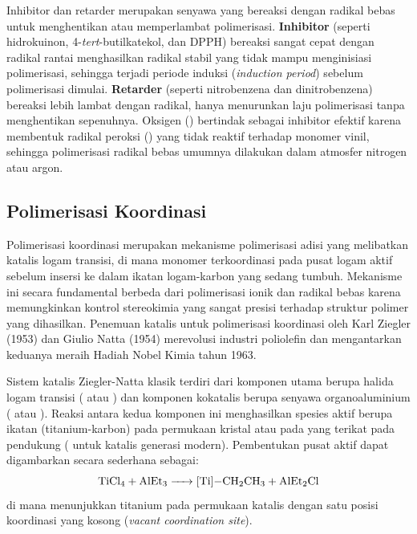 \documentclass[12pt,a4paper,openany]{book}
\begin{document}
Inhibitor dan retarder merupakan senyawa yang bereaksi dengan radikal bebas untuk menghentikan atau memperlambat polimerisasi. \textbf{Inhibitor} (seperti hidrokuinon, 4-\textit{tert}-butilkatekol, dan DPPH) bereaksi sangat cepat dengan radikal rantai menghasilkan radikal stabil yang tidak mampu menginisiasi polimerisasi, sehingga terjadi periode induksi (\textit{induction period}) sebelum polimerisasi dimulai. \textbf{Retarder} (seperti nitrobenzena dan dinitrobenzena) bereaksi lebih lambat dengan radikal, hanya menurunkan laju polimerisasi tanpa menghentikan sepenuhnya. Oksigen () bertindak sebagai inhibitor efektif karena membentuk radikal peroksi () yang tidak reaktif terhadap monomer vinil, sehingga polimerisasi radikal bebas umumnya dilakukan dalam atmosfer nitrogen atau argon.

\subsection{Polimerisasi Koordinasi}

Polimerisasi koordinasi merupakan mekanisme polimerisasi adisi yang melibatkan katalis logam transisi, di mana monomer terkoordinasi pada pusat logam aktif sebelum insersi ke dalam ikatan logam-karbon yang sedang tumbuh. Mekanisme ini secara fundamental berbeda dari polimerisasi ionik dan radikal bebas karena memungkinkan kontrol stereokimia yang sangat presisi terhadap struktur polimer yang dihasilkan. Penemuan katalis untuk polimerisasi koordinasi oleh Karl Ziegler (1953) dan Giulio Natta (1954) merevolusi industri poliolefin dan mengantarkan keduanya meraih Hadiah Nobel Kimia tahun 1963.

Sistem katalis Ziegler-Natta klasik terdiri dari komponen utama berupa halida logam transisi ( atau ) dan komponen kokatalis berupa senyawa organoaluminium ( atau ). Reaksi antara kedua komponen ini menghasilkan spesies aktif berupa ikatan  (titanium-karbon) pada permukaan kristal  atau pada  yang terikat pada pendukung ( untuk katalis generasi modern). Pembentukan pusat aktif dapat digambarkan secara sederhana sebagai:
\begin{equation}
  \ce{TiCl4 + AlEt3 -> [Ti]-CH2CH3 + AlEt2Cl}
\end{equation}
di mana \ce{[Ti]} menunjukkan titanium pada permukaan katalis dengan satu posisi koordinasi yang kosong (\textit{vacant coordination site}).
\end{document}
